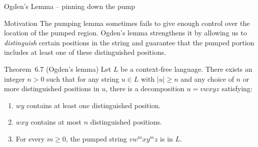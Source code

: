 \begin{frame}[t]{Ogden’s Lemma – pinning down the pump}
  \begin{tblock}{Motivation}
    The pumping lemma sometimes fails to give enough control over the
    location of the pumped region.  Ogden’s lemma strengthens it by
    allowing us to \emph{distinguish} certain positions in the string and
    guarantee that the pumped portion includes at least one of these
    distinguished positions.
  \end{tblock}
  \begin{tblock}{Theorem 6.7 (Ogden’s lemma)}
    Let $L$ be a context‑free language.  There exists an integer $n>0$
    such that for any string $u \in L$ with $|u| \ge n$ and any choice
    of $n$ or more distinguished positions in $u$, there is a
    decomposition $u = v w x y z$ satisfying:
    \begin{enumerate}
      \item $w y$ contains at least one distinguished position.
      \item $w x y$ contains at most $n$ distinguished positions.
      \item For every $m \ge 0$, the pumped string $v w^m x y^m z$ is in
        $L$.
    \end{enumerate}
  \end{tblock}
  \label{fr:6.1-22}
\end{frame}

